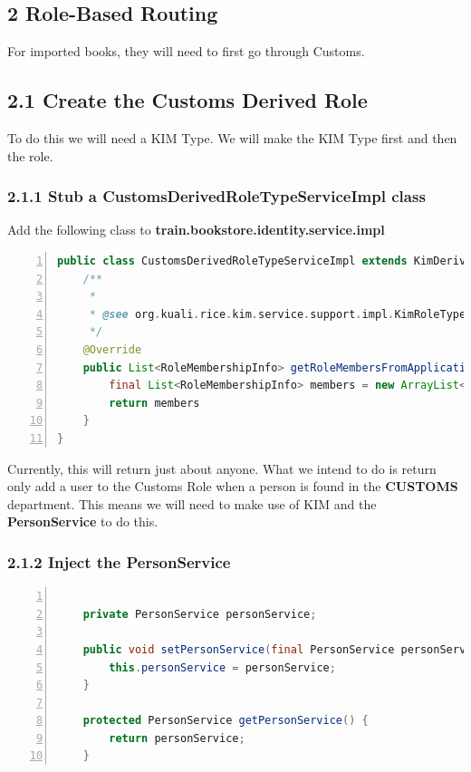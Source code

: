 \subsection*{2 Role-Based Routing}
For imported books, they will need to first go through Customs.

\subsection*{2.1 Create the Customs Derived Role}
To do this we will need a KIM Type. We will make the KIM Type first
and then the role.
\subsubsection*{2.1.1 Stub a CustomsDerivedRoleTypeServiceImpl class}
Add the following class to \textbf{train.bookstore.identity.service.impl}
\begin{lstlisting}[numbers=left,language=java,basicstyle=\scriptsize,backgroundcolor=\color{ubergray},caption={Stubbed
  CustomsDerivedRoleTypeServiceImpl.java},frame=single,breaklines=true]
public class CustomsDerivedRoleTypeServiceImpl extends KimDerivedRoleTypeServiceBase {
    /**
     * 
     * @see org.kuali.rice.kim.service.support.impl.KimRoleTypeServiceBase#getPrincipalIdsFromApplicationRole(java.lang.String, java.lang.String, org.kuali.rice.kim.bo.types.dto.AttributeSet)
     */
    @Override
    public List<RoleMembershipInfo> getRoleMembersFromApplicationRole(String namespaceCode, String roleName, AttributeSet qualification) {
        final List<RoleMembershipInfo> members = new ArrayList<RoleMembershipInfo>();
        return members
    }
}
\end{lstlisting}

Currently, this will return just about anyone. What we intend to do is
return only add a user to the Customs Role when a person is found in
the \textbf{CUSTOMS} department. This means we will need to make use
of KIM and the \textbf{PersonService} to do this. 

\subsubsection*{2.1.2 Inject the PersonService}
\begin{lstlisting}[numbers=left,language=java,basicstyle=\scriptsize,backgroundcolor=\color{ubergray},caption={Stubbed
    CustomsDerivedRoleTypeServiceImpl.java},frame=single,breaklines=true]

    private PersonService personService;

    public void setPersonService(final PersonService personService) {
        this.personService = personService;
    }

    protected PersonService getPersonService() {
        return personService;
    }
\end{lstlisting}

